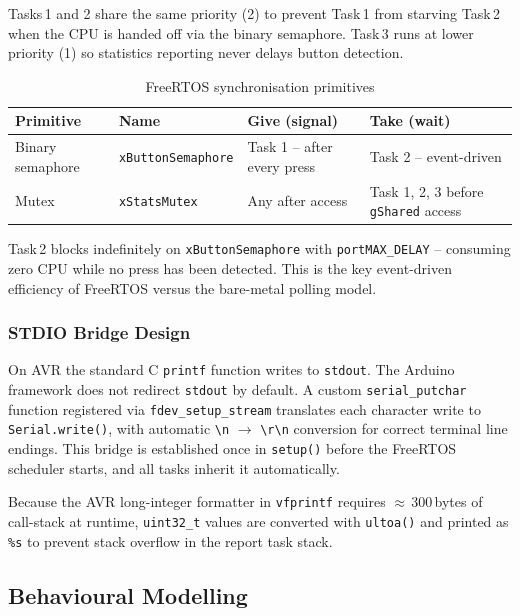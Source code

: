 \documentclass[12pt]{article}
\begin{document}
Tasks\,1 and 2 share the same priority (2) to prevent Task\,1 from starving Task\,2 when the CPU is handed off via the binary semaphore. Task\,3 runs at lower priority (1) so statistics reporting never delays button detection.

\begin{table}[H!]
\centering
\begin{tabular}{llll}
\toprule
\textbf{Primitive} & \textbf{Name} & \textbf{Give (signal)} & \textbf{Take (wait)} \\
\midrule
Binary semaphore & \texttt{xButtonSemaphore} & Task 1 -- after every press & Task 2 -- event-driven \\
Mutex & \texttt{xStatsMutex} & Any after access & Task 1, 2, 3 before \texttt{gShared} access \\
\bottomrule
\end{tabular}
\caption{FreeRTOS synchronisation primitives}
\label{tab:sync}
\end{table}

Task\,2 blocks indefinitely on \texttt{xButtonSemaphore} with \texttt{portMAX\_DELAY} -- consuming zero CPU while no press has been detected. This is the key event-driven efficiency of FreeRTOS versus the bare-metal polling model.

\subsubsection{STDIO Bridge Design}

On AVR the standard C \texttt{printf} function writes to \texttt{stdout}. The Arduino framework does not redirect \texttt{stdout} by default. A custom \texttt{serial\_putchar} function registered via \texttt{fdev\_setup\_stream} translates each character write to \texttt{Serial.write()}, with automatic \texttt{\textbackslash{}n} $\rightarrow$ \texttt{\textbackslash{}r\textbackslash{}n} conversion for correct terminal line endings. This bridge is established once in \texttt{setup()} before the FreeRTOS scheduler starts, and all tasks inherit it automatically.

Because the AVR long-integer formatter in \texttt{vfprintf} requires $\approx$\,300\,bytes of call-stack at runtime, \texttt{uint32\_t} values are converted with \texttt{ultoa()} and printed as \texttt{\%s} to prevent stack overflow in the report task stack.

\subsection{Behavioural Modelling}
\end{document}
